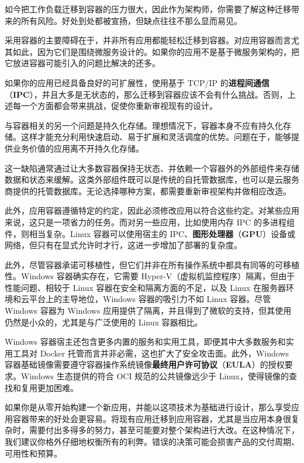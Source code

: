 如今把工作负载迁移到容器的压力很大，因此作为架构师，你需要了解这种迁移带来的所有风险。好处到处都被宣扬，但缺点往往不那么显而易见。

\label{idx:1733}
采用容器的主要障碍在于，并非所有应用都能轻松迁移到容器。对应用容器而言尤其如此，因为它们是围绕微服务设计的。如果你的应用不是基于微服务架构的，把它放进容器可能引入的问题比解决的还多。

\label{idx:1734}
如果你的应用已经具备良好的可扩展性，使用基于 TCP/IP 的\textbf{进程间通信}（\textbf{IPC}），并且大多是无状态的，那么迁移到容器应该不会有什么挑战。否则，上述每一个方面都会带来挑战，促使你重新审视现有的设计。

与容器相关的另一个问题是持久化存储。理想情况下，容器本身不应有持久化存储。这样才能充分利用快速启动、易于扩展和灵活调度的优势。问题在于，能够提供业务价值的应用离不开持久化存储。

这一缺陷通常通过让大多数容器保持无状态、并依赖一个容器外的外部组件来存储数据和状态来缓解。这类外部组件既可以是传统的自托管数据库，也可以是云服务商提供的托管数据库。无论选择哪种方案，都需要重新审视架构并做相应改造。

\label{idx:1735}
此外，应用容器遵循特定的约定，因此必须修改应用以符合这些约定。对某些应用来说，这只是一项省力的任务。而对另一些应用，比如使用内存 IPC 的多进程组件，则相当复杂。Linux 容器可以使用宿主的 IPC、\textbf{图形处理器}（\textbf{GPU}）设备或网络，但只有在显式允许时才行，这进一步增加了部署的复杂度。

此外，尽管容器承诺可移植性，但它们并非在所有操作系统中都具有同等的可移植性。Windows 容器确实存在，它需要 Hyper-V（虚拟机监控程序）隔离，但由于性能问题、相较于 Linux 容器在安全和隔离方面的不足，以及 Linux 在服务器环境和云平台上的主导地位，Windows 容器的吸引力不如 Linux 容器。尽管 Windows 容器为 Windows 应用提供了隔离，并且得到了微软的支持，但其使用仍然是小众的，尤其是与广泛使用的 Linux 容器相比。

\label{idx:1736}
Windows 容器宿主还包含更多内置的服务和实用工具，即便其中大多数服务和实用工具对 Docker 托管而言并非必需，这也扩大了安全攻击面。此外，Windows 容器基础镜像需要遵守容器操作系统镜像\textbf{最终用户许可协议}（\textbf{EULA}）的授权要求。Windows 生态提供的符合 OCI 规范的公共镜像远少于 Linux，使得镜像的查找和复用更加困难。

\label{idx:1737}
如果你是从零开始构建一个新应用，并能以这项技术为基础进行设计，那么享受应用容器带来的好处会更容易。将现有应用迁移到应用容器，尤其是当应用本身很复杂时，需要付出多得多的努力，甚至可能要对整个架构进行大改。在这种情况下，我们建议你格外仔细地权衡所有的利弊。错误的决策可能会损害产品的交付周期、可用性和预算。

